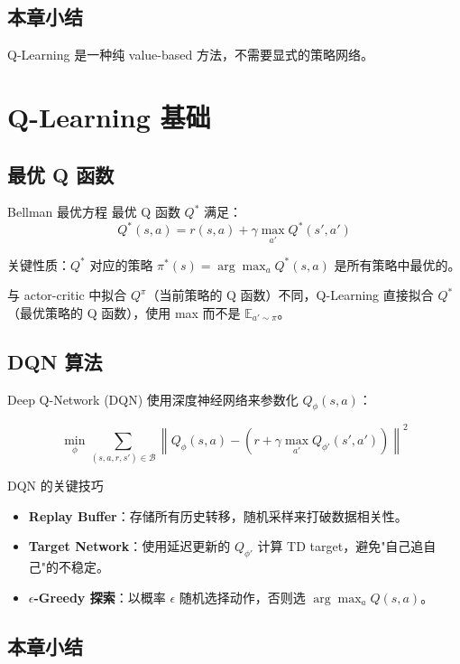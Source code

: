 \documentclass[a4paper]{article}
\begin{document}
\subsection{本章小结}

Q-Learning 是一种纯 value-based 方法，不需要显式的策略网络。

\section{Q-Learning 基础}

\subsection{最优 Q 函数}

\begin{importantbox}{Bellman 最优方程}
最优 Q 函数 $Q^*$ 满足：
$$Q^*(s, a) = r(s, a) + \gamma \max_{a'} Q^*(s', a')$$

关键性质：$Q^*$ 对应的策略 $\pi^*(s) = \arg\max_a Q^*(s, a)$ 是所有策略中最优的。
\end{importantbox}

与 actor-critic 中拟合 $Q^\pi$（当前策略的 Q 函数）不同，Q-Learning 直接拟合 $Q^*$（最优策略的 Q 函数），使用 max 而不是 $\mathbb{E}_{a' \sim \pi}$。

\subsection{DQN 算法}

Deep Q-Network (DQN) 使用深度神经网络来参数化 $Q_\phi(s, a)$：

$$\min_\phi \sum_{(s,a,r,s') \in \mathcal{B}} \left\| Q_\phi(s, a) - \left(r + \gamma \max_{a'} Q_{\phi'}(s', a')\right) \right\|^2$$

\begin{importantbox}{DQN 的关键技巧}
\begin{itemize}
    \item \textbf{Replay Buffer}：存储所有历史转移，随机采样来打破数据相关性。
    \item \textbf{Target Network}：使用延迟更新的 $Q_{\phi'}$ 计算 TD target，避免"自己追自己"的不稳定。
    \item \textbf{$\epsilon$-Greedy 探索}：以概率 $\epsilon$ 随机选择动作，否则选 $\arg\max_a Q(s,a)$。
\end{itemize}
\end{importantbox}

\subsection{本章小结}
 
\end{document}
